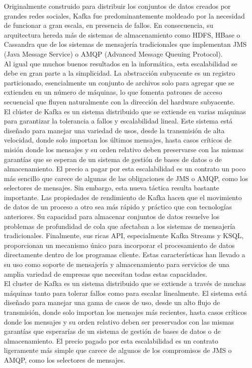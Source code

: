 \documentclass{article}
\begin{document}
Originalmente construido para distribuir los conjuntos de datos creados por grandes redes sociales, Kafka fue predominantemente moldeado por la necesidad de funcionar a gran escala, en presencia de fallos. En consecuencia, su arquitectura hereda más de sistemas de almacenamiento como HDFS, HBase o Cassandra que de los sistemas de mensajería tradicionales que implementan JMS (Java Message Service) o AMQP (Advanced Message Queuing Protocol).\\

Al igual que muchos buenos resultados en la informática, esta escalabilidad se debe en gran parte a la simplicidad. La abstracción subyacente es un registro particionado, esencialmente un conjunto de archivos solo para agregar que se extienden en un número de máquinas, lo que fomenta patrones de acceso secuencial que fluyen naturalmente con la dirección del hardware subyacente.\\

El clúster de Kafka es un sistema distribuido que se extiende en varias máquinas para garantizar la tolerancia a fallos y escalabilidad lineal. Este sistema está diseñado para manejar una variedad de usos, desde la transmisión de alta velocidad, donde solo importan los últimos mensajes, hasta casos críticos de misión donde los mensajes y su orden relativo deben preservarse con las mismas garantías que se esperan de un sistema de gestión de bases de datos o de almacenamiento. El precio a pagar por esta escalabilidad es un contrato un poco más sencillo que carece de algunas de las obligaciones de JMS o AMQP, como los selectores de mensajes.
Sin embargo, esta nueva táctica resulta bastante importante. Las propiedades de rendimiento de Kafka hacen que el movimiento de datos de un proceso a otro sea más rápido y práctico que con tecnologías anteriores. Su capacidad para almacenar conjuntos de datos resuelve los problemas de profundidad de cola que afectaban a los sistemas de mensajería tradicionales. Finalmente, sus ricas API, especialmente Kafka Streams y KSQL, proporcionan un mecanismo único para incorporar el procesamiento de datos directamente dentro de los programas cliente. Estas características han llevado a su uso como soporte de mensajería y almacenamiento para servicios de una amplia variedad de empresas que necesitan todas estas capacidades.\\

El cluster de Kafka es un sistema distribuido que se extiende a través de muchas máquinas tanto para tolerar fallos como para escalar linealmente. El sistema está diseñado para manejar una gama de casos de uso, desde un alto flujo de transmisión, donde solo importan los mensajes más recientes, hasta casos críticos donde los mensajes y su orden relativo deben ser preservados con las mismas garantías que esperarías de un sistema de gestión de bases de datos o de almacenamiento. El precio pagado por esta escalabilidad es un contrato ligeramente más simple que carece de algunos de los compromisos de JMS o AMQP, como los selectores de mensajes.\\
\end{document}
